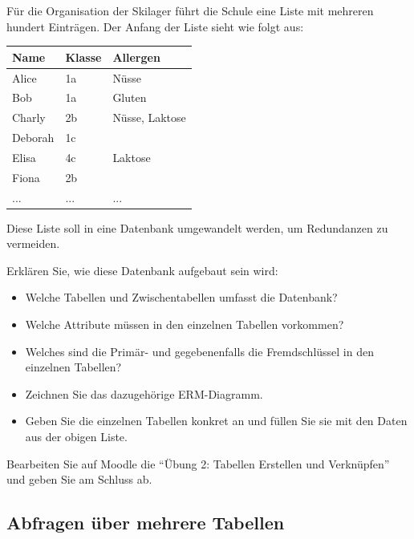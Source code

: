 \begin{myexercise}
  Für die Organisation der Skilager führt die Schule eine Liste mit mehreren hundert Einträgen. Der Anfang der Liste sieht wie folgt aus:

  \begin{tabular}{l|l|l}
    Name	& Klasse&	Allergen \\ \hline
    Alice	&1a	&Nüsse \\
    Bob	&1a	&Gluten \\
    Charly	&2b	&Nüsse, Laktose \\
    Deborah	&1c&	 \\
    Elisa	&4c	&Laktose \\
    Fiona	&2b	& \\
    ...	&...	&...
  \end{tabular}


Diese Liste soll in eine Datenbank umgewandelt werden, um Redundanzen zu vermeiden.

Erklären Sie, wie diese Datenbank aufgebaut sein wird:

\begin{itemize}
  \item Welche Tabellen und Zwischentabellen umfasst die Datenbank?
  \item Welche Attribute müssen in den einzelnen Tabellen vorkommen?
  \item Welches sind die Primär- und gegebenenfalls die Fremdschlüssel in den einzelnen Tabellen?
  \item Zeichnen Sie das dazugehörige ERM-Diagramm.
  \item Geben Sie die einzelnen Tabellen konkret an und füllen Sie sie mit den Daten aus der obigen Liste.
\end{itemize}
\end{myexercise}


\begin{myexercise}
  Bearbeiten Sie auf Moodle die \enquote{Übung 2: Tabellen Erstellen und Verknüpfen} und geben Sie am Schluss ab.
\end{myexercise}


















\subsection{Abfragen über mehrere Tabellen}

